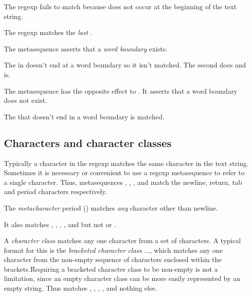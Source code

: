 {

\n The regexp fails to match because  does not
occur at the beginning of the text string.


\n The regexp matches the {\em last} .

The metasequence \p{\b} asserts that
a {\em word boundary} exists.


\n The  in  doesn't end at a word
boundary so it isn't matched.  The second  does
and is.

The metasequence \p{\B} has the opposite effect
to \p{\b}.   It asserts that a word boundary
does not exist.


\n The  that doesn't end in a word boundary
is matched.

\subsection{Characters and character classes}

Typically a character in the regexp matches the same
character in the text string.  Sometimes it is
necessary or convenient to use a regexp
metasequence to refer to a single character.
Thus, metasequences \p{\n}, \p{\r}, \p{\t}, and \p{\.}
match the newline, return, tab and period characters
respectively.

The {\em metacharacter} period () matches
{\em any} character other than newline.


\n It also matches , , , ,
and  but not  or .

A {\em character class} matches any one character from
a set of characters.  A typical format for this
is the {\em bracketed character class} \p{[}...\p{]},
which matches any one character from the non-empty sequence
of characters enclosed within the brackets.\f{Requiring
a bracketed character class to be non-empty is not a limitation,
since an
empty character class
can be more easily represented by an empty string.}
Thus  matches , , ,
,  and nothing else.

}

